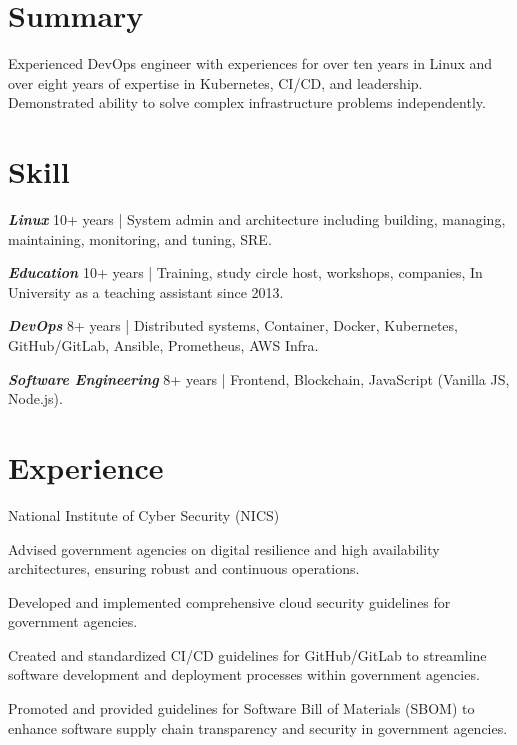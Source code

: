 \documentclass[]{deedy-resume-openfont}
\begin{document}
\begin{minipage}[t]{1\textwidth}



\section{Summary}
\begin{summary}
    Experienced DevOps engineer with experiences for over ten years in Linux and over eight years of expertise in Kubernetes, CI/CD, and leadership. Demonstrated ability to solve complex infrastructure problems independently.
\end{summary}

\section{Skill}
\vspace{\topsep}
\begin{tightemize}
    \item \textbf{\emph{Linux}} 10+ years | System admin and architecture including building, managing, maintaining, monitoring, and tuning, SRE.
    \item \textbf{\emph{Education}} 10+ years | Training, study circle host, workshops, companies, In University as a teaching assistant since 2013.
    \item \textbf{\emph{DevOps}} 8+ years | Distributed systems, Container, Docker, Kubernetes, GitHub/GitLab, Ansible, Prometheus, AWS Infra.
    \item \textbf{\emph{Software Engineering}}  8+ years | Frontend, Blockchain, JavaScript (Vanilla JS, Node.js).
\end{tightemize}


\section{Experience}

National Institute of Cyber Security (NICS)

\null\hfill{}
\begin{tightemize}
    \item Advised government agencies on digital resilience and high availability architectures, ensuring robust and continuous operations.
    \item Developed and implemented comprehensive cloud security guidelines for government agencies.
    \item Created and standardized CI/CD guidelines for GitHub/GitLab to streamline software development and deployment processes within government agencies.
    \item Promoted and provided guidelines for Software Bill of Materials (SBOM) to enhance software supply chain transparency and security in government agencies.
\end{tightemize}
\sectionsep


\end{minipage}
\end{document}
